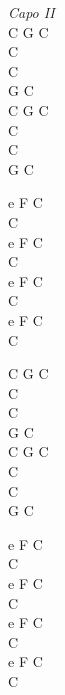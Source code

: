 \begin{chord}
    \textit{Capo II}\\
    C G C\\
    C\\
    C\\
    G C\\
    C G C\\
    C\\
    C\\
    G C

    e F C\\
    C\\
    e F C\\
    C\\
    e F C\\
    C\\
    e F C\\
    C

    C G C\\
    C\\
    C\\
    G C\\
    C G C\\
    C\\
    C\\
    G C

    e F C\\
    C\\
    e F C\\
    C\\
    e F C\\
    C\\
    e F C\\
    C
    \end{chord}
\vfill
